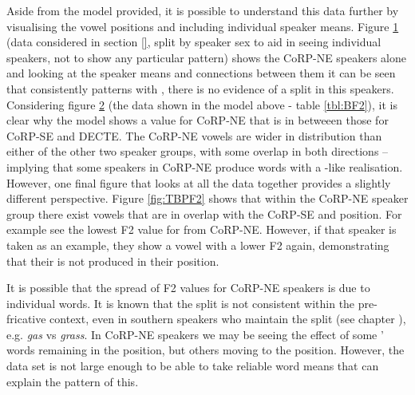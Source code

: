 \documentclass[../../../00.FullDoc/tex/APRReport-year4]{subfiles}
\begin{document}
Aside from the model provided, it is possible to understand this data further by visualising the vowel positions and including individual speaker means. Figure \ref{fig:TBPNEF2} (data considered in section \ref{}, split by speaker sex to aid in seeing individual speakers, not to show any particular pattern) shows the CoRP-NE speakers alone and looking at the speaker means and connections between them it can be seen that \bath{} consistently patterns with \trap{}, there is no evidence of a \TB{} split in this speakers.
Considering figure \ref{fig:BF2} (the data shown in the model above - table \ref{tbl:BF2}), it is clear why the model shows a \bath{} value for CoRP-NE that is in betweeen those for CoRP-SE and DECTE. The CoRP-NE \bath{} vowels are wider in distribution than either of the other two speaker groups, with some overlap in both directions – implying that some speakers in CoRP-NE produce \bath{} words with a \palm{}-like realisation.
However, one final figure that looks at all the data together provides a slightly different perspective. Figure \ref{fig:TBPF2} shows that within the CoRP-NE speaker group there exist \bath{} vowels that are in overlap with the CoRP-SE \bath{} and \palm{} position. For example see the lowest F2 value for \bath{} from CoRP-NE. However, if that speaker is taken as an example, they show a \palm{} vowel with a lower F2 again, demonstrating that their \bath{} is not produced in their \palm{} position.

It is possible that the spread of F2 values for CoRP-NE speakers is due to individual words. It is known that the \TB{} split is not consistent within the pre-fricative context, even in southern speakers who maintain the split (see chapter \notinsubfile{\ref{ch:LitReviewSocio}} ), e.g. \textit{gas} vs \textit{grass}. In CoRP-NE speakers we may be seeing the effect of some '\quotesingle{\bath{}} words remaining in the \trap{} position, but others moving to the \palm{} position. However, the data set is not large enough to be able to take reliable word means that can explain the pattern of this.

\begin{figure}[h]

	\caption{\bath{}} \label{fig:TBPNEF2}
\end{figure}

\begin{figure}[h]
	
	\caption{\bath{}} \label{fig:BF2}
\end{figure}
\end{document}
